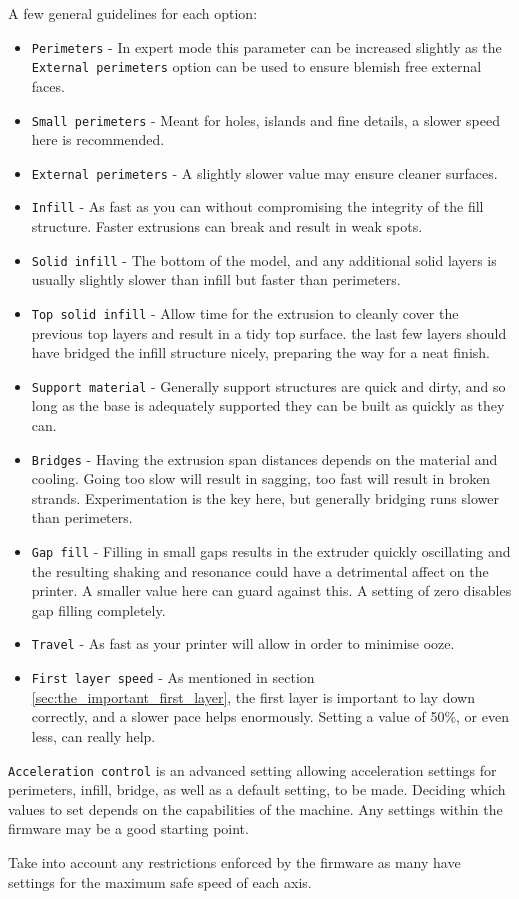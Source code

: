 A few general guidelines for each option:
\begin{itemize}
	\item \texttt{Perimeters}  - In expert mode this parameter can be increased slightly as the \texttt{External perimeters} option can be used to ensure blemish free external faces.
	\item \texttt{Small perimeters}  - Meant for holes, islands and fine details, a slower speed here is recommended.
	\item \texttt{External perimeters}  - A slightly slower value may ensure cleaner surfaces.
	\item \texttt{Infill}  - As fast as you can without compromising the integrity of the fill structure.  Faster extrusions can break and result in weak spots.
	\item \texttt{Solid infill}  - The bottom of the model, and any additional solid layers is usually slightly slower than infill but faster than perimeters.
	\item \texttt{Top solid infill}  - Allow time for the extrusion to cleanly cover the previous top layers and result in a tidy top surface.  the last few layers should have bridged the infill structure nicely, preparing the way for a neat finish.
	\item \texttt{Support material}  - Generally support structures are quick and dirty, and so long as the base is adequately supported they can be built as quickly as they can.
	\item \texttt{Bridges}  - Having the extrusion span distances depends on the material and cooling.  Going too slow will result in sagging, too fast will result in broken strands.  Experimentation is the key here, but generally bridging runs slower than perimeters.
	\item \texttt{Gap fill}  - Filling in small gaps results in the extruder quickly oscillating and the resulting shaking and resonance could have a detrimental affect on the printer.  A smaller value here can guard against this.  A setting of zero disables gap filling completely.
	\item \texttt{Travel}  - As fast as your printer will allow in order to minimise ooze.
	\item \texttt{First layer speed}  - As mentioned in section \ref{sec:the_important_first_layer}, the first layer is important to lay down correctly, and a slower pace helps enormously.  Setting a value of 50\%, or even less, can really help.
\end{itemize}

\texttt{Acceleration control} is an advanced setting allowing acceleration settings for perimeters, infill, bridge, as well as a default setting, to be made.  Deciding which values to set depends on the capabilities of the machine.  Any settings within the firmware may be a good starting point.

Take into account any restrictions enforced by the firmware as many have settings for the maximum safe speed of each axis.

